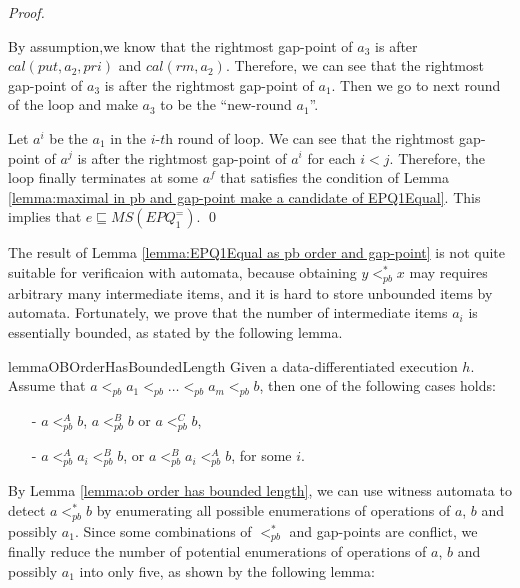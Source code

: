 \begin {proof}
\begin{itemize}
\begin{itemize}
        By assumption,we know that the rightmost gap-point of $a_3$ is after $\textit{cal}(\textit{put},a_2,\textit{pri})$ and $\textit{cal}(\textit{rm},a_2)$. Therefore, we can see that the rightmost gap-point of $a_3$ is after the rightmost gap-point of $a_1$. Then we go to next round of the loop and make $a_3$ to be the ``new-round $a_1$''.
    \end{itemize}
\end{itemize}

Let $a^i$ be the $a_1$ in the $\textit{i-th}$ round of loop. We can see that the rightmost gap-point of $a^j$ is after the rightmost gap-point of $a^i$ for each $i<j$. Therefore, the loop finally terminates at some $a^f$ that satisfies the condition of Lemma \ref{lemma:maximal in pb and gap-point make a candidate of EPQ1Equal}. This implies that $e \sqsubseteq \textit{MS}(\textit{EPQ}_1^{=})$. \qed
\end {proof}

The result of Lemma \ref{lemma:EPQ1Equal as pb order and gap-point} is not quite suitable for verificaion with automata, because obtaining $y <_{\textit{pb}}^* x$ may requires arbitrary many intermediate items, and it is hard to store unbounded items by automata. Fortunately, we prove that the number of intermediate items $a_i$ is essentially bounded, as stated by the following lemma.

\begin{restatable}{lemma}{OBOrderHasBoundedLength}
\label{lemma:ob order has bounded length}
Given a data-differentiated execution $h$. Assume that $a <_{\textit{pb}} a_1 <_{\textit{pb}} \ldots <_{\textit{pb}} a_m <_{\textit{pb}} b$, then one of the following cases holds:

\begin{itemize}
\setlength{\itemsep}{0.5pt}
\item[-] $a <_{\textit{pb}}^A b$, $a <_{\textit{pb}}^B b$ or $a <_{\textit{pb}}^C b$,

\item[-] $a <_{\textit{pb}}^A a_i <_{\textit{pb}}^B b$, or $a <_{\textit{pb}}^B a_i <_{\textit{pb}}^A b$, for some $i$.
\end{itemize}
\end{restatable}

By Lemma \ref{lemma:ob order has bounded length}, we can use witness automata to detect $a <_{\textit{pb}}^* b$ by enumerating all possible enumerations of operations of $a$, $b$ and possibly $a_1$. Since some combinations of $<_{\textit{pb}}^*$ and gap-points are conflict, we finally reduce the number of potential enumerations of operations of $a$, $b$ and possibly $a_1$ into only five, as shown by the following lemma:

